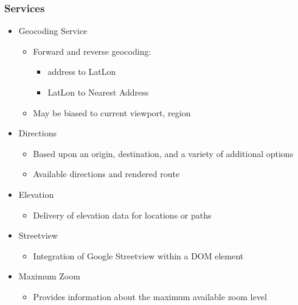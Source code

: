 \documentclass[]{article}
\begin{document}
\subsubsection{Services}\label{services}

\begin{itemize}
\itemsep1pt\parskip0pt
\item
  Geocoding Service

  \begin{itemize}
  \itemsep1pt\parskip0pt
  \item
    Forward and reverse geocoding:

    \begin{itemize}
    \itemsep1pt\parskip0pt
    \item
      address to LatLon
    \item
      LatLon to Nearest Address
    \end{itemize}
  \item
    May be biased to current viewport, region
  \end{itemize}
\item
  Directions

  \begin{itemize}
  \itemsep1pt\parskip0pt
  \item
    Based upon an origin, destination, and a variety of additional
    options
  \item
    Available directions and rendered route
  \end{itemize}
\item
  Elevation

  \begin{itemize}
  \itemsep1pt\parskip0pt
  \item
    Delivery of elevation data for locations or paths
  \end{itemize}
\item
  Streetview

  \begin{itemize}
  \itemsep1pt\parskip0pt
  \item
    Integration of Google Streetview within a DOM element
  \end{itemize}
\item
  Maximum Zoom

  \begin{itemize}
  \itemsep1pt\parskip0pt
  \item
    Provides information about the maximum available zoom level
  \end{itemize}
\end{itemize}
\end{document}
